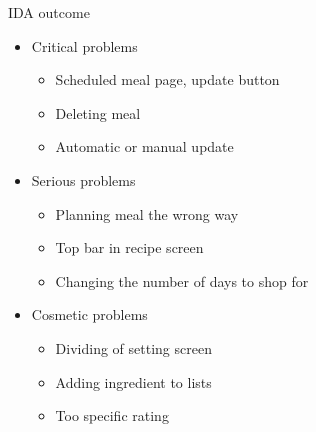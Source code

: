 \begin{frame}{IDA outcome}
    \begin{itemize}
	\item Critical problems
		\begin{itemize}
			\item Scheduled meal page, update button
			\item Deleting meal
			\item Automatic or manual update
		\end{itemize}
	\item Serious problems
		\begin{itemize}
			\item Planning meal the wrong way
			\item Top bar in recipe screen
			\item Changing the number of days to shop for 
		\end{itemize}
	\item Cosmetic problems
		\begin{itemize}
			\item Dividing of setting screen
			\item Adding ingredient to lists
			\item Too specific rating
		\end{itemize}
    \end{itemize}
\end{frame}

